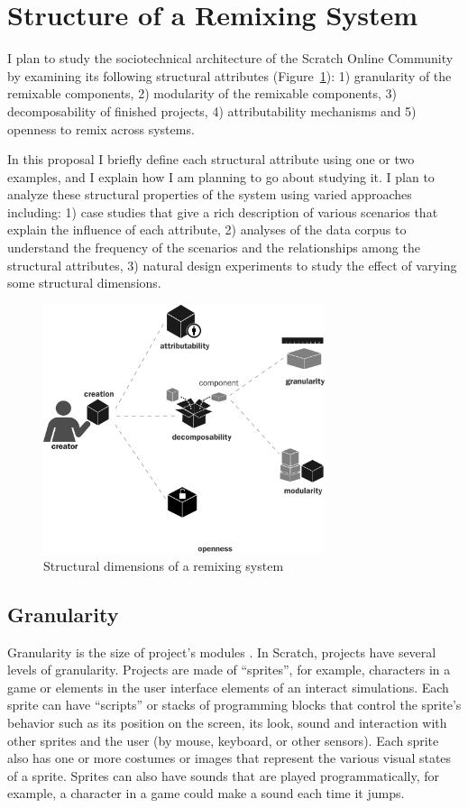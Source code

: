 \section{Structure of a Remixing System} 
I plan to study the sociotechnical architecture of the Scratch Online Community by examining its following structural attributes (Figure~\ref{fig:structure}):
1) granularity of the remixable components, 
2) modularity of the remixable components, 
3) decomposability of finished projects, 
4) attributability mechanisms and 
5) openness to remix across systems.

In this proposal I briefly define each structural attribute using one or two examples, and I explain how I am planning to go about studying it.
I plan to analyze these structural properties of the system using varied approaches including:
1) case studies that give a rich description of various scenarios that explain the influence of each attribute,
2) analyses of the data corpus to understand the frequency of the scenarios and the relationships among the structural attributes,
3) natural design experiments to study the effect of varying some structural dimensions.

\begin{figure} 
\centering
\includegraphics[width=3.25in]{figures/structure.pdf}
\caption{Structural dimensions of a remixing system}
\label{fig:structure}
\end{figure}

\subsection{Granularity}
Granularity is the size of project's modules \citet{benkler_coases_2002}. 
In Scratch, projects have several levels of granularity.
Projects are made of ``sprites'', for example, characters in a game or elements in the user interface elements of an interact simulations.
Each sprite can have ``scripts'' or stacks of programming blocks that control the sprite's behavior such as its position on the screen, its look, sound and interaction with other sprites and the user (by mouse, keyboard, or other sensors).
Each sprite also has one or more costumes or images that represent the various visual states of a sprite.
Sprites can also have sounds that are played programmatically, for example, a character in a game could make a sound each time it jumps.

